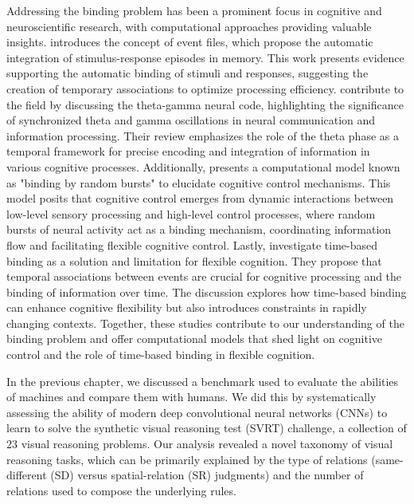 Addressing the binding problem has been a prominent focus in cognitive and neuroscientific research, with computational approaches providing valuable insights. \citet{hommel1998event} introduces the concept of event files, which propose the automatic integration of stimulus-response episodes in memory. This work presents evidence supporting the automatic binding of stimuli and responses, suggesting the creation of temporary associations to optimize processing efficiency. \citet{lisman2013theta} contribute to the field by discussing the theta-gamma neural code, highlighting the significance of synchronized theta and gamma oscillations in neural communication and information processing. Their review emphasizes the role of the theta phase as a temporal framework for precise encoding and integration of information in various cognitive processes. Additionally, \citet{verguts2017binding} presents a computational model known as "binding by random bursts" to elucidate cognitive control mechanisms. This model posits that cognitive control emerges from dynamic interactions between low-level sensory processing and high-level control processes, where random bursts of neural activity act as a binding mechanism, coordinating information flow and facilitating flexible cognitive control. Lastly, \citet{senoussi2022time} investigate time-based binding as a solution and limitation for flexible cognition. They propose that temporal associations between events are crucial for cognitive processing and the binding of information over time. The discussion explores how time-based binding can enhance cognitive flexibility but also introduces constraints in rapidly changing contexts. Together, these studies contribute to our understanding of the binding problem and offer computational models that shed light on cognitive control and the role of time-based binding in flexible cognition.

In the previous chapter, we discussed a benchmark used to evaluate the abilities of machines and compare them with humans. We did this by systematically assessing the ability of modern deep convolutional neural networks (CNNs) to learn to solve the synthetic visual reasoning test (SVRT) challenge, a collection of 23 visual reasoning problems. Our analysis revealed a novel taxonomy of visual reasoning tasks, which can be primarily explained by the type of relations (same-different (SD) versus spatial-relation (SR) judgments) and the number of relations used to compose the underlying rules.

